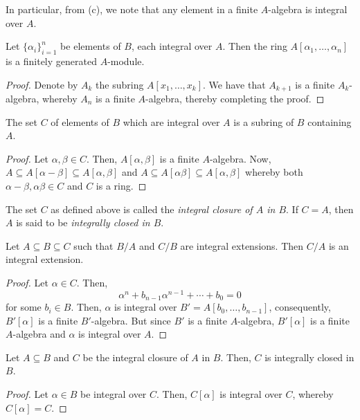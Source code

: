 In particular, from (c), we note that any element in a finite $A$-algebra is integral over $A$.

\begin{proposition}
    Let $\{\alpha_i\}_{i = 1}^n$ be elements of $B$, each integral over $A$. Then the ring $A[\alpha_1,\ldots,\alpha_n]$ is a finitely generated $A$-module.
\end{proposition}
\begin{proof}
    Denote by $A_k$ the subring $A[x_1,\ldots,x_k]$. We have that $A_{k + 1}$ is a finite $A_k$-algebra, whereby $A_n$ is a finite $A$-algebra, thereby completing the proof.
\end{proof}

\begin{corollary}
    The set $C$ of elements of $B$ which are integral over $A$ is a subring of $B$ containing $A$.
\end{corollary}
\begin{proof}
    Let $\alpha,\beta\in C$. Then, $A[\alpha,\beta]$ is a finite $A$-algebra. Now, $A\subseteq A[\alpha - \beta]\subseteq A[\alpha,\beta]$ and $A\subseteq A[\alpha\beta]\subseteq A[\alpha,\beta]$ whereby both $\alpha - \beta,\alpha\beta\in C$ and $C$ is a ring.
\end{proof}

The set $C$ as defined above is called the \textit{integral closure of $A$ in $B$}. If $C = A$, then $A$ is said to be \textit{integrally closed in $B$}.

\begin{theorem}
    Let $A\subseteq B\subseteq C$ such that $B/A$ and $C/B$ are integral extensions. Then $C/A$ is an integral extension.
\end{theorem}
\begin{proof}
    Let $\alpha\in C$. Then, 
    \begin{equation*}
        \alpha^n + b_{n - 1}\alpha^{n - 1} + \cdots + b_0 = 0
    \end{equation*}
    for some $b_i\in B$. Then, $\alpha$ is integral over $B' = A[b_0,\ldots,b_{n - 1}]$, consequently, $B'[\alpha]$ is a finite $B'$-algebra. But since $B'$ is a finite $A$-algebra, $B'[\alpha]$ is a finite $A$-algebra and $\alpha$ is integral over $A$.
\end{proof}

\begin{corollary}
    Let $A\subseteq B$ and $C$ be the integral closure of $A$ in $B$. Then, $C$ is integrally closed in $B$.
\end{corollary}
\begin{proof}
    Let $\alpha\in B$ be integral over $C$. Then, $C[\alpha]$ is integral over $C$, whereby $C[\alpha] = C$.
\end{proof}

